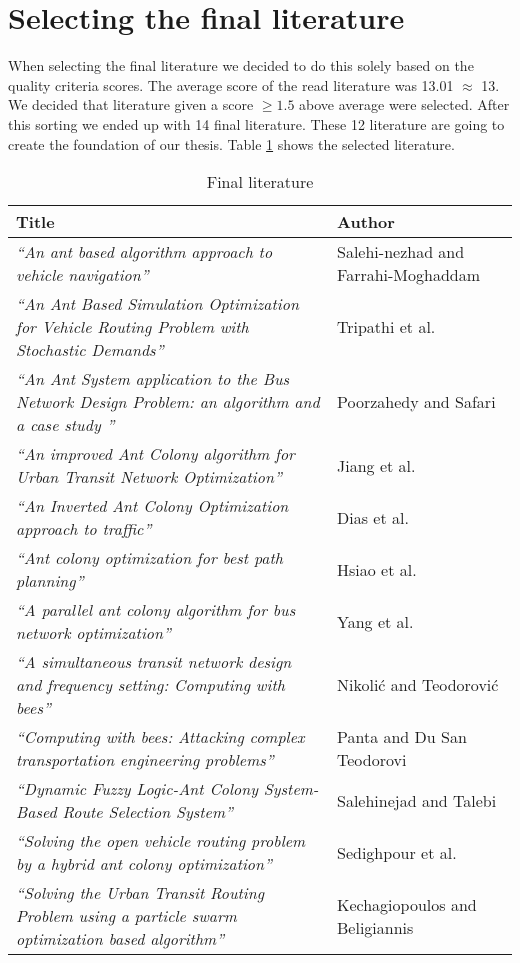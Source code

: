 \section{Selecting the final literature}
When selecting the final literature we decided to do this solely based on the quality criteria scores. The average score of the read literature was 13.01 $\approx$ 13. We decided that literature given a score $\geq{1.5}$ above average were selected. After this sorting we ended up with 14 final literature. These 12 literature are going to create the foundation of our thesis. Table \ref{table:finalliterature} shows the selected literature. 

\begin{table}[!htb]
    {
    \begin{center}
    \small
    \begin{tabular}[c]{| m{7cm} | m{7cm} |}
        \hline
        \textbf{Title} & \textbf{Author} \\ \hline
        \textit{``An ant based algorithm approach to vehicle navigation''} & Salehi-nezhad and Farrahi-Moghaddam \\ \hline
        \textit{``An Ant Based Simulation Optimization for Vehicle Routing Problem with Stochastic Demands''} & Tripathi et al. \\ \hline
        \textit{``An Ant System application to the Bus Network Design Problem: an algorithm and a case study ''} & Poorzahedy and Safari \\ \hline
        \textit{``An improved Ant Colony algorithm for Urban Transit Network Optimization''} & Jiang et al. \\ \hline
        \textit{``An Inverted Ant Colony Optimization approach to traffic''} & Dias et al. \\ \hline
        \textit{``Ant colony optimization for best path planning''} & Hsiao et al. \\ \hline
        \textit{``A parallel ant colony algorithm for bus network optimization''} & Yang et al. \\ \hline
        \textit{``A simultaneous transit network design and frequency setting: Computing with bees''} & Nikolić and Teodorović \\ \hline
        \textit{``Computing with bees: Attacking complex transportation engineering problems''} & Panta and Du San Teodorovi \\ \hline
        \textit{``Dynamic Fuzzy Logic-Ant Colony System-Based Route Selection System''} & Salehinejad and Talebi \\ \hline
        \textit{``Solving the open vehicle routing problem by a hybrid ant colony optimization''} & Sedighpour et al. \\ \hline
        \textit{``Solving the Urban Transit Routing Problem using a particle swarm optimization based algorithm''} & Kechagiopoulos and Beligiannis \\ 
        \hline
    \end{tabular}
    \end{center}
    } 
\caption{Final literature}\label{table:finalliterature}
\end{table}
